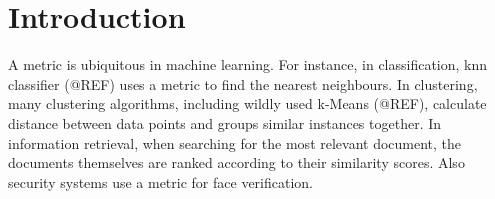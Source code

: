 \documentclass[12pt,a4paper]{report}
\begin{document}



\tableofcontents







%
%
%
%
%
%

\chapter{Introduction} \label{introduction}

A metric is ubiquitous in machine learning. For instance, in classification, \ac{knn} classifier (@REF) uses a metric to find the nearest neighbours. In clustering, many clustering algorithms, including wildly used k-Means (@REF), calculate distance between data points and groups similar instances together. In information retrieval, when searching for the most relevant document, the documents themselves are ranked according to their similarity scores. Also security systems use a metric for face verification. 
\end{document}
